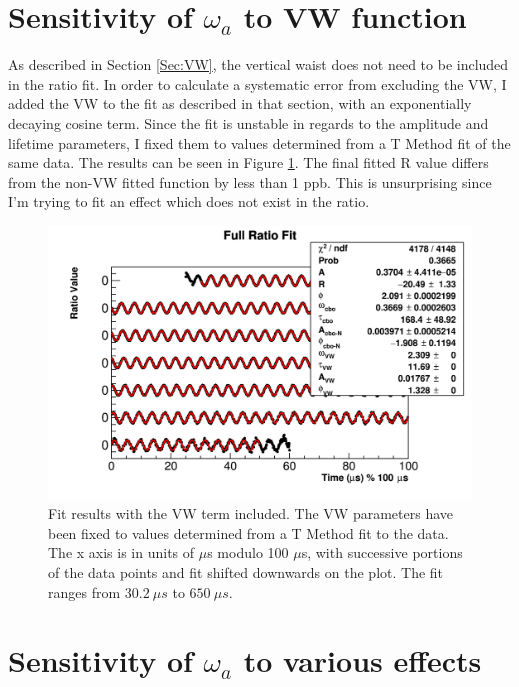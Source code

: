 \section{Sensitivity of \texorpdfstring{$\omega_{a}$}{} to VW function}
\label{Sec:SystematicVW}

	As described in Section \ref{Sec:VW}, the vertical waist does not need to be included in the ratio fit. In order to calculate a systematic error from excluding the VW, I added the VW to the fit as described in that section, with an exponentially decaying cosine term. Since the fit is unstable in regards to the amplitude and lifetime parameters, I fixed them to values determined from a T Method fit of the same data. The results can be seen in Figure \ref{fig:VWModuloPlot}. The final fitted R value differs from the non-VW fitted function by less than 1 ppb. This is unsurprising since I'm trying to fit an effect which does not exist in the ratio.

	\begin{figure}[]
		\centering
		\includegraphics[width=\textwidth]{ratioCBO_moduloPlot-VW}
	    \caption[VWModuloPlot]{Fit results with the VW term included. The VW parameters have been fixed to values determined from a T Method fit to the data. The x axis is in units of $\mu$s modulo 100 $\mu$s, with successive portions of the data points and fit shifted downwards on the plot. The fit ranges from $\SI{30.2}{\mu s}$ to $\SI{650}{\mu s}$.}
	    \label{fig:VWModuloPlot}
	\end{figure}



\section{Sensitivity of \texorpdfstring{$\omega_{a}$}{} to various effects}

